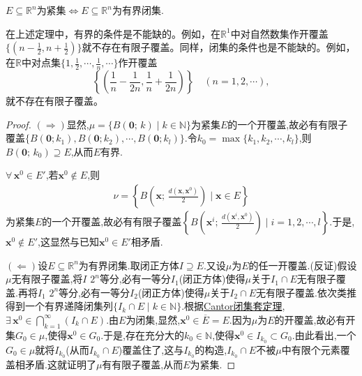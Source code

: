\documentclass[../../main.tex]{subfiles}%
\begin{document}
\begin{theorem}\label{theorem:Heine - Borel有限子覆盖定理}
$E\subseteq\mathbb{R}^n$为紧集$\iff E\subseteq\mathbb{R}^n$为有界闭集.
\end{theorem}
\begin{remark}
在上述定理中，有界的条件是不能缺的。例如，在\(\mathbb{R}^1\)中对自然数集作开覆盖\(\{(n-\frac{1}{2},n+\frac{1}{2})\}\)就不存在有限子覆盖。同样，闭集的条件也是不能缺的。例如，在\(\mathbb{R}\)中对点集\(\{1,\frac{1}{2},\cdots,\frac{1}{n},\cdots\}\)作开覆盖
\[\left\{\left(\frac{1}{n}-\frac{1}{2n},\frac{1}{n}+\frac{1}{2n}\right)\right\}\quad(n = 1,2,\cdots),\]
就不存在有限子覆盖。
\end{remark}
\begin{proof}

$(\Rightarrow)$显然,$\mu=\{B(\mathbf{0};\,k)\mid k\in\mathbb{N}\}$为紧集$E$的一个开覆盖,故必有有限子覆盖$\{B(\mathbf{0};k_1),B(\mathbf{0};k_2),\cdots,B(\mathbf{0};k_l)\}$.令$k_0=\max\{k_1,k_2,\cdots,k_l\}$,则$B(\mathbf{0};\,k_0)\supseteq E$,从而$E$有界.

$\forall\,\mathbf{x}^0\in E'$,若$\mathbf{x}^0\notin E$,则
\begin{align*}
\nu=\left\{B\left(\mathbf{x};\,\frac{d(\mathbf{x},\mathbf{x}^0)}{2}\right)\mid \mathbf{x}\in E\right\}
\end{align*}
为紧集$E$的一个开覆盖,故必有有限子覆盖$\left\{B\left(\mathbf{x}^i;\,\frac{d(\mathbf{x}^i,\mathbf{x}^0)}{2}\right)\mid i=1,2,\cdots,l\right\}$.于是,$\mathbf{x}^0\notin E'$,这显然与已知$\mathbf{x}^0\in E'$相矛盾.

$(\Leftarrow)$设$E\subseteq\mathbb{R}^n$为有界闭集.取闭正方体$I\supseteq E$.又设$\mu$为$E$的任一开覆盖.(反证)假设$\mu$无有限子覆盖,将$I$ $2^n$等分,必有一等分$I_1$(闭正方体)使得$\mu$关于$I_1\cap E$无有限子覆盖.再将$I_1$ $2^n$等分,必有一等分$I_2$(闭正方体)使得$\mu$关于$I_2\cap E$无有限子覆盖.依次类推得到一个有界递降闭集列$\{I_k\cap E\mid k\in\mathbb{N}\}$.根据\hyperref[theorem:实变函数--Cantor闭集套定理]{Cantor闭集套定理},$\exists\,\mathbf{x}^0\in\bigcap\limits_{k=1}^{\infty}(I_k\cap E)$.由$E$为闭集,显然,$\mathbf{x}^0\in\overline{E}=E$.因为$\mu$为$E$的开覆盖,故必有开集$G_0\in\mu$,使得$\mathbf{x}^0\in G_0$.于是,存在充分大的$k_0\in\mathbb{N}$,使得$\mathbf{x}^0\in I_{k_0}\subset G_0$.由此看出,一个$G_0\in\mu$就将$I_{k_0}$(从而$I_{k_0}\cap E$)覆盖住了,这与$I_{k_0}$的构造,$I_{k_0}\cap E$不被$\mu$中有限个元素覆盖相矛盾.这就证明了$\mu$有有限子覆盖,从而$E$为紧集.
\end{proof}
\end{document}
